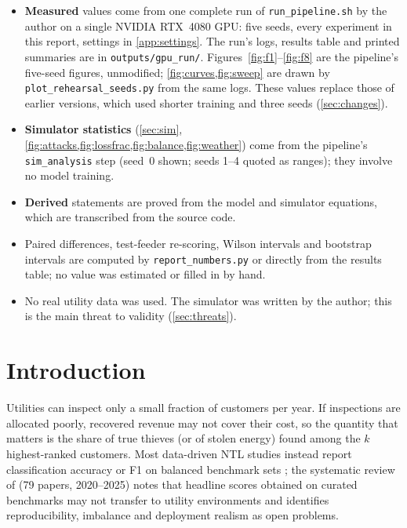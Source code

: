 \documentclass[11pt,a4paper]{article}
\theoremstyle{plain}
\theoremstyle{definition}
\theoremstyle{remark}
\begin{document}
\begin{note}
\begin{itemize}[leftmargin=1.2em]
\item \textbf{Measured} values come from one complete run of \texttt{run\_pipeline.sh} by the author on a single NVIDIA RTX~4080 GPU: five seeds, every experiment in this report, settings in \cref{app:settings}. The run's logs, results table and printed summaries are in \texttt{outputs/gpu\_run/}. Figures~\ref{fig:f1}--\ref{fig:f8} are the pipeline's five-seed figures, unmodified; \cref{fig:curves,fig:sweep} are drawn by \texttt{plot\_rehearsal\_seeds.py} from the same logs. These values replace those of earlier versions, which used shorter training and three seeds (\cref{sec:changes}).
\item \textbf{Simulator statistics} (\cref{sec:sim}, \cref{fig:attacks,fig:lossfrac,fig:balance,fig:weather}) come from the pipeline's \texttt{sim\_analysis} step (seed~0 shown; seeds 1--4 quoted as ranges); they involve no model training.
\item \textbf{Derived} statements are proved from the model and simulator equations, which are transcribed from the source code.
\item Paired differences, test-feeder re-scoring, Wilson intervals and bootstrap intervals are computed by \texttt{report\_numbers.py} or directly from the results table; no value was estimated or filled in by hand.
\item No real utility data was used. The simulator was written by the author; this is the main threat to validity (\cref{sec:threats}).
\end{itemize}
\end{note}

\tableofcontents
\newpage

\section{Introduction}
Utilities can inspect only a small fraction of customers per year. If inspections are allocated poorly, recovered revenue may not cover their cost, so the quantity that matters is the share of true thieves (or of stolen energy) found among the $k$ highest-ranked customers. Most data-driven NTL studies instead report classification accuracy or F1 on balanced benchmark sets \citep{morgoev2026review,iftikhar2024}; the systematic review of \citet{morgoev2026review} (79 papers, 2020--2025) notes that headline scores obtained on curated benchmarks may not transfer to utility environments and identifies reproducibility, imbalance and deployment realism as open problems.
\end{document}
